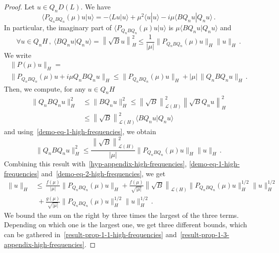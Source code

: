 \documentclass[10pt]{amsart}
\theoremstyle{definition}\newtheorem{defi}[theo]{Definition}\newtheorem{rema}[theo]{Remark}\newtheorem{exam}[theo]{Example}\newtheorem{exem}[theo]{Example}\newtheorem{nota}[theo]{Notation}
\newcommand{\Lc}{\mathcal{L}}
\let\oldforall\forall
\renewcommand*{\forall}{\mathrel{\oldforall}}
\begin{document}
\begin{proof}
Let $u\in Q_n D(L)$. We have
\[
\langle P_{Q_n B Q_n}(\mu) u | u \rangle = -\langle L u| u
\rangle + \mu^2 \langle u|u\rangle - i \mu \langle B Q_n u|Q_n u \rangle\,.
\]
In particular, the imaginary part of $\langle P_{Q_n B Q_n}(\mu)u|u\rangle$ is $\mu \langle B Q_n u|Q_n u\rangle$ and
\begin{equation}\label{demo-eq-1-high-frequencies}
\forall u\in Q_n H\,,\:\langle B Q_n u|Q_n u\rangle=\left\|\sqrt{B} u\right\|_H^2 \leq \frac 1{|\mu|} \|P_{Q_n B Q_n}(\mu) u\|_H \|u\|_H\,.
\end{equation}
We write
\begin{multline}\label{demo-eq-2-high-frequencies}
\|P(\mu)u\|_H=\\
\|P_{Q_n B Q_n}(\mu)u + i\mu Q_n B Q_n u\|_H \leq \|P_{Q_n B Q_n}(\mu)u\|_H+|\mu|\,\|Q_n B Q_n u\|_H\,.
\end{multline}
Then, we compute, for any $u\in Q_n H$
\begin{align*}
\|Q_n B Q_n u\|_H^2 &\leq \|B Q_n u\|_H^2 \leq \left\|\sqrt{B}\right\|^2_{\Lc(H)} \left\|\sqrt{B}Q_nu\right\|_H^2\\
& \leq \left\|\sqrt{B}\right\|^2_{\Lc(H)} \langle B Q_n u |Q_n u\rangle
\end{align*}
and using~\eqref{demo-eq-1-high-frequencies}, we obtain
\[
\|Q_n B Q_n u\|_H^2 \leq \frac {\left\|\sqrt{B}\right\|^2_{\Lc(H)}} {|\mu|}
\|P_{Q_n B Q_n}(\mu)u\|_H\|u\|_H\,.
\]
Combining this result with~\eqref{hyp-appendix-high-frequencies}, \eqref{demo-eq-1-high-frequencies} and~\eqref{demo-eq-2-high-frequencies}, we get
\begin{align*}
\|u\|_H &\leq\,\frac{f(\mu)}{|\mu|} \|P_{Q_n B Q_n}(\mu)u\|_H + \frac{f(\mu)}{\sqrt {|\mu|}} {\left\|\sqrt{B}\right\|_{\Lc(H)}}
\|P_{Q_n B Q_n}(\mu)u\|_H^{1/2}\|u\|_H^{1/2}\\
&\;+\frac{g(\mu)}{\sqrt {|\mu|}} \|P_{Q_n B Q_n}(\mu)u\|_H^{1/2}\|u\|_H^{1/2}\,.
\end{align*}
We bound the sum on the right by three times the largest of the three terms. Depending on which one is the largest one, we get three different bounds, which can be gathered in~\eqref{result-prop-1-1-high-frequencies} and~\eqref{result-prop-1-3-appendix-high-frequencies}.
\end{proof}
\end{document}
